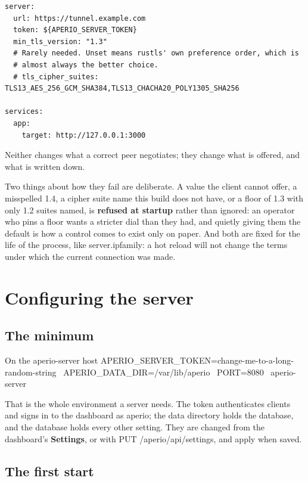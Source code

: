 \documentclass[11pt,a4paper,oneside]{book}
\newcommand{\aperiobreakableunderscore}{\textunderscore\allowbreak}
\newcommand{\aperiocodebreaks}{\XeTeXinterchartokenstate=1 }
\newcommand{\aperiocodebreaks}{}
\DeclareRobustCommand{\code}[1]{{\ttfamily\small\aperiocodebreaks
  \let\_\aperiobreakableunderscore#1}}
\begin{document}
\begin{lstlisting}[language=aperioyaml]
server:
  url: https://tunnel.example.com
  token: ${APERIO_SERVER_TOKEN}
  min_tls_version: "1.3"
  # Rarely needed. Unset means rustls' own preference order, which is
  # almost always the better choice.
  # tls_cipher_suites: TLS13_AES_256_GCM_SHA384,TLS13_CHACHA20_POLY1305_SHA256

services:
  app:
    target: http://127.0.0.1:3000
\end{lstlisting}

Neither changes what a correct peer negotiates; they change what is offered,
and what is written down.

Two things about how they fail are deliberate. A value the client cannot
offer, a misspelled \code{1.4}, a cipher suite name this build does not have,
or a floor of 1.3 with only 1.2 suites named, is \textbf{refused at startup}
rather than ignored: an operator who pins a floor wants a stricter dial than
they had, and quietly giving them the default is how a control comes to exist
only on paper. And both are fixed for the life of the process, like
\code{server.ip\_family}: a hot reload will not change the terms under which
the current connection was made.

\chapter{Configuring the server}
\label{ch:server-config}

\section{The minimum}

\begin{codecard}[aperiosh]{On the aperio-server host}
APERIO_SERVER_TOKEN=change-me-to-a-long-random-string \
APERIO_DATA_DIR=/var/lib/aperio \
PORT=8080 \
  aperio-server
\end{codecard}

That is the whole environment a server needs. The token authenticates
clients and signs in to the dashboard as \code{aperio}; the data directory
holds the database, and the database holds every other setting. They are
changed from the dashboard's \textbf{Settings}, or with
\code{PUT /aperio/api/settings}, and apply when saved.

\section{The first start}
\end{document}
